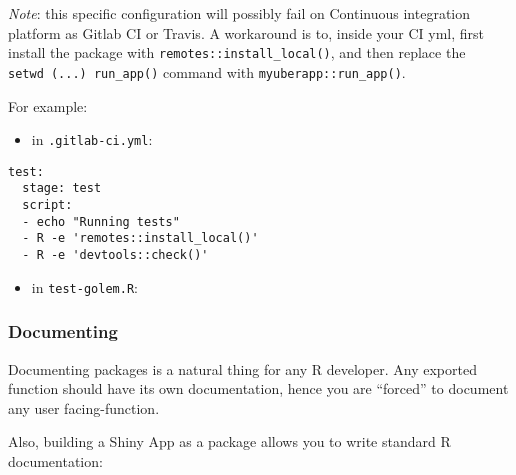 \documentclass[]{book}
\newenvironment{Shaded}{\begin{snugshade}}{\end{snugshade}}
\newcommand{\DecValTok}[1]{\textcolor[rgb]{0.00,0.00,0.81}{#1}}
\newcommand{\KeywordTok}[1]{\textcolor[rgb]{0.13,0.29,0.53}{\textbf{#1}}}
\newcommand{\NormalTok}[1]{#1}
\newcommand{\OperatorTok}[1]{\textcolor[rgb]{0.81,0.36,0.00}{\textbf{#1}}}
\newcommand{\StringTok}[1]{\textcolor[rgb]{0.31,0.60,0.02}{#1}}
\providecommand{\tightlist}{%
  \setlength{\itemsep}{0pt}\setlength{\parskip}{0pt}}
\begin{document}
\emph{Note}: this specific configuration will possibly fail on Continuous integration platform as Gitlab CI or Travis. A workaround is to, inside your CI yml, first install the package with \texttt{remotes::install\_local()}, and then replace the \texttt{setwd\ (...)\ run\_app()} command with \texttt{myuberapp::run\_app()}.

For example:

\begin{itemize}
\tightlist
\item
  in \texttt{.gitlab-ci.yml}:
\end{itemize}

\begin{verbatim}
test:
  stage: test
  script: 
  - echo "Running tests"
  - R -e 'remotes::install_local()'
  - R -e 'devtools::check()'
\end{verbatim}

\begin{itemize}
\tightlist
\item
  in \texttt{test-golem.R}:
\end{itemize}

\begin{Shaded}
\end{Shaded}

\hypertarget{documenting}{%
\subsubsection{Documenting}\label{documenting}}

Documenting packages is a natural thing for any R developer. Any exported function should have its own documentation, hence you are ``forced'' to document any user facing-function.

Also, building a Shiny App as a package allows you to write standard R documentation:
\end{document}
